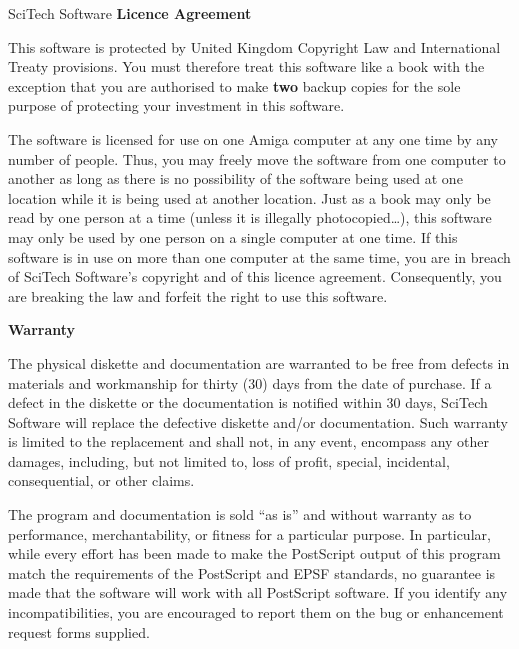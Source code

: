 \documentclass{report}
\begin{document}
\begin{center}
\Large\sf SciTech Software \bf Licence Agreement
\end{center}
\vspace*{1ex}
This software is protected by United Kingdom Copyright
Law and International 
Treaty provisions. You must therefore treat this software like a book with the 
exception that you are authorised to make {\bf two} backup
copies for the sole purpose of protecting your investment in this software.

The software is licensed for use on one Amiga computer at any one time by any
number of people. Thus, you 
may freely move the software from one computer to another as long as there is no 
possibility of the software being used at one location while it is being used at 
another location. Just as a book may only be read by one person at a time (unless 
it is illegally photocopied\ldots), this software may only be used by one person 
on a single computer at one time. If this software is in use on more than one 
computer at the same time, you are in breach of {\sf SciTech Software's} 
copyright and of this licence agreement. Consequently, you are breaking the law 
and forfeit the right to use this software.

\vspace*{1em}
\begin{center}
\Large\bf Warranty
\end{center}
\vspace*{1ex}
The physical diskette and documentation are warranted to be free 
from defects in 
materials and workmanship for thirty (30) days from the date of purchase. If a 
defect in the diskette or the documentation is notified within 30 days, {\sf 
SciTech Software} will replace the defective diskette and/or documentation. Such 
warranty is limited to the replacement and shall not, in any event,
encompass any other damages, 
including, but not limited to, loss of profit, special, incidental, consequential, 
or other claims.

The program and documentation is sold ``as is'' and without warranty as to 
performance, merchantability, or fitness for a particular purpose. In particular,
while every effort has been made to make the PostScript output of this program
match the requirements of the PostScript and EPSF standards, no guarantee is made
that the software will work with all PostScript software. If you identify any
incompatibilities, you are encouraged to report them on the bug or enhancement
request forms supplied.
\end{document}
